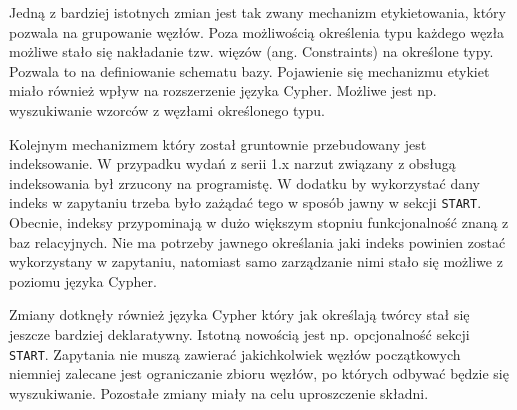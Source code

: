 \documentclass[brudnopis]{xmgr}
\begin{document}
Jedną z bardziej istotnych zmian jest tak zwany mechanizm etykietowania, który pozwala na grupowanie węzłów. Poza możliwością określenia typu każdego węzła możliwe stało się nakładanie tzw. więzów (ang. Constraints) na określone typy. Pozwala to na definiowanie schematu bazy. Pojawienie się mechanizmu etykiet miało również wpływ na rozszerzenie języka Cypher. Możliwe jest np. wyszukiwanie wzorców z węzłami określonego typu.

Kolejnym mechanizmem który został gruntownie przebudowany jest indeksowanie. W przypadku wydań z serii 1.x narzut związany z obsługą indeksowania był zrzucony na programistę. W dodatku by wykorzystać dany indeks w zapytaniu trzeba było zażądać tego w sposób jawny w sekcji \texttt{START}. Obecnie, indeksy przypominają w dużo większym stopniu funkcjonalność znaną z baz relacyjnych. Nie ma potrzeby jawnego określania jaki indeks powinien zostać wykorzystany w zapytaniu, natomiast samo zarządzanie nimi stało się możliwe z poziomu języka Cypher.

Zmiany dotknęły również języka Cypher który jak określają twórcy stał się jeszcze bardziej deklaratywny. Istotną nowością jest np. opcjonalność sekcji \texttt{START}. Zapytania nie muszą zawierać jakichkolwiek węzłów początkowych niemniej zalecane jest ograniczanie zbioru węzłów, po których odbywać będzie się wyszukiwanie. Pozostałe zmiany miały na celu uproszczenie składni.

\nocite{*}



\listoftables

\listoffigures

\oswiadczenie
\end{document}
